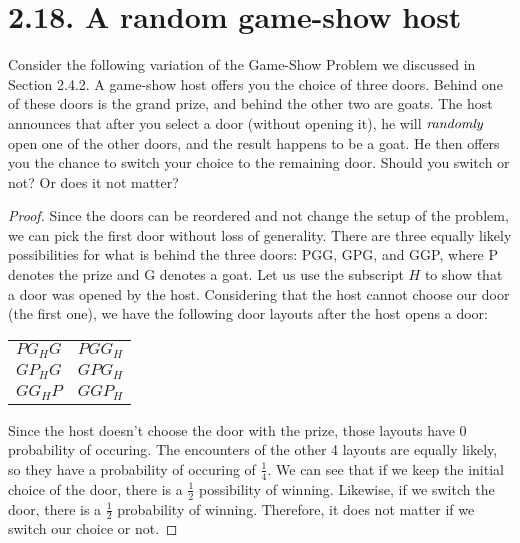 \section*{2.18. A random game-show host}
Consider the following variation of the Game-Show Problem we discussed in Section 2.4.2. A game-show
host offers you the choice of three doors. Behind one of these doors is the grand prize, and behind
the other two are goats. The host announces that after you select a door (without opening it), he will
$\emph{randomly}$ open one of the other doors, and the result happens to be a goat. He then offers
you the chance to switch your choice to the remaining door. Should you switch or not? Or does it 
not matter?

\vspace{1em}

\begin{proof}
    Since the doors can be reordered and not change the setup of the problem, we can pick the first
    door without loss of generality. There are three equally likely possibilities
    for what is behind the three doors: PGG, GPG, and GGP, where P denotes the prize and G denotes
    a goat. Let us use the subscript $H$ to show that a door was opened by the host. Considering that
    the host cannot choose our door (the first one), we have the following door layouts after the host 
    opens a door:

    \pagebreak

    \begin{table}[h]
        \centering
        \begin{tabular}{cc}
            $PG_H G$ & $PGG_H$ \\ 
            $GP_HG$ & $GPG_H$ \\
            $GG_HP$ & $GGP_H$
        \end{tabular}
    \end{table}

    Since the host doesn't choose the door with the prize, those layouts have 0 probability of 
    occuring. The encounters of the other 4 layouts are equally likely, so they have a probability 
    of occuring of $\frac{1}{4}$. We can see that if we keep the initial choice of the door,
    there is a $\frac{1}{2}$ possibility of winning. Likewise, if we switch the door, there 
    is a $\frac{1}{2}$ probability of winning. Therefore, it does not matter if we switch our choice or not.
\end{proof}

